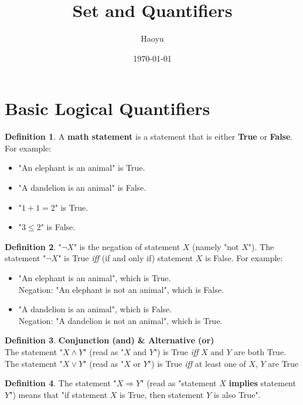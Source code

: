 \documentclass{book}
\title{Set and Quantifiers}
\author{Haoyu}
\date{\today}
\theoremstyle{remark}
\theoremstyle{definition}
\newtheorem{definition}{Definition}[section]
\begin{document}
\section{Basic Logical Quantifiers}

\begin{definition}
    A \textbf{math statement} is a statement that is either \textbf{True} or \textbf{False}. For example:
    \begin{itemize}
        \item "An elephant is an animal" is True.
        \item "A dandelion is an animal" is False.
        \item "$1+1=2$" is True.
        \item "$3 \le 2$" is False.
    \end{itemize}
\end{definition}

\begin{definition}
    "$\neg X$" is the negation of statement $X$ (namely "not $X$"). The statement "$\neg X$" is True \textit{iff} (if and only if) statement $X$ is False. For example:
    \begin{itemize}
        \item "An elephant is an animal", which is True.\\
        Negation: "An elephant is not an animal", which is False.
        \item "A dandelion is an animal", which is False.\\
        Negation: "A dandelion is not an animal", which is True.
    \end{itemize}
\end{definition}

\begin{definition} \textbf{Conjunction (and) & Alternative (or)}\\
    The statement "$X \wedge Y$" (read as "$X$ and $Y$") is True \textit{iff} $X$ and $Y$ are both True.\\
    The statement "$X \vee Y$" (read as "$X$ or $Y$") is True \textit{iff} at least one of $X$, $Y$ are True
\end{definition}

\begin{definition}
    The statement "$X \Rightarrow Y$" (read as "statement $X$ \textbf{implies} statement $Y$") means that "if statement $X$ is True, then statement $Y$ is also True".
\end{definition}
\end{document}
